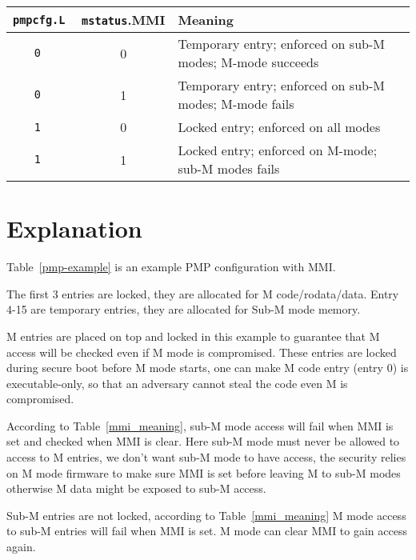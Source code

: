 \documentclass[twoside,11pt]{article}
\begin{document}
\begin{table*}[h!]
\begin{center}
  \begin{tabular}{|c|c|l|}
  \hline
  \tt {\tt pmpcfg}.L    & {\tt mstatus}.MMI & Meaning \\
  \hline
  \tt 0 & 0 & Temporary entry; enforced on sub-M modes; M-mode succeeds\\
  \tt 0 & 1 & Temporary entry; enforced on sub-M modes; M-mode fails \\
  \tt 1 & 0 & Locked entry; enforced on all modes \\
  \tt 1 & 1 & Locked entry; enforced on M-mode; sub-M modes fails \\
  \hline
  \end{tabular}
\end{center}
\caption{Meaning of MMI and Lock}
\label{mmi_meaning}
\end{table*}

\section{Explanation}

Table~\ref{pmp-example} is an example PMP configuration with MMI.

The first 3 entries are locked, they are allocated for M code/rodata/data. Entry 4-15 are temporary entries, they are allocated for Sub-M mode memory. 

M entries are placed on top and locked in this example to guarantee that M access will be checked even if M mode is compromised. These entries are locked during secure boot before M mode starts, one can make M code entry (entry 0) is executable-only, so that an adversary cannot steal the code even M is compromised.

According to Table~\ref{mmi_meaning}, sub-M mode access will fail when MMI is set and checked when MMI is clear. Here sub-M mode must never be allowed to access to M entries, we don't want sub-M mode to have access, the security relies on M mode firmware to make sure MMI is set before leaving M to sub-M modes otherwise M data might be exposed to sub-M access.

Sub-M entries are not locked, according to Table~\ref{mmi_meaning} M mode access to sub-M entries will fail when MMI is set. M mode can clear MMI to gain access again. 
\end{document}
